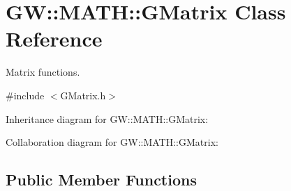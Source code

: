 \hypertarget{classGW_1_1MATH_1_1GMatrix}{}\section{GW\+::M\+A\+TH\+::G\+Matrix Class Reference}
\label{classGW_1_1MATH_1_1GMatrix}


Matrix functions.  




{\ttfamily \#include $<$G\+Matrix.\+h$>$}



Inheritance diagram for GW\+::M\+A\+TH\+::G\+Matrix\+:


Collaboration diagram for GW\+::M\+A\+TH\+::G\+Matrix\+:
\subsection*{Public Member Functions}

